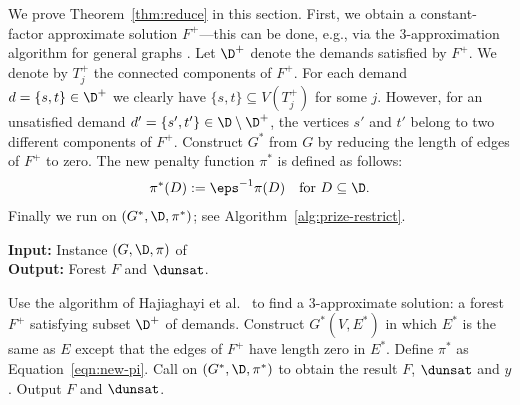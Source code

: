 We prove Theorem~\ref{thm:reduce} in this section.
First, we obtain a constant-factor approximate solution $F^+$---this can be done, e.g., via the $3$-approximation algorithm for general graphs \cite{HKKN10}.
Let $\D^+$ denote the demands satisfied by $F^+$.
 We denote by $T^+_j$ the connected components of $F^+$.
 For each demand $d=\{s,t\}\in\D^+$ we clearly have $\{s,t\} \subseteq V(T^+_j)$
for some $j$.  However, for an unsatisfied demand $d'=\{s',t'\} \in \D \setminus \D^+$,
the vertices $s'$ and $t'$ belong to  two different components of $F^+$.
Construct $G^\ast$ from $G$ by reducing the length of edges of $F^+$ to zero.
The new penalty function $\pi^\ast$ is defined as follows:
\begin{align}\label{eqn:new-pi}
\pi^\ast(D) &:= \eps^{-1} \pi(D) &\text{for } D \subseteq \D.
\end{align}
 Finally we run  on $(G^\ast, \D, \pi^\ast)$; see Algorithm~\ref{alg:prize-restrict}. 















\begin{algorithm}
\caption{\label{alg:prize-restrict}}
\textbf{Input:} Instance $(G, \D, \pi)$ of \\
\textbf{Output:} Forest $F$ and $\dunsat$.

\begin{algorithmic}[1]
 \STATE Use the algorithm of Hajiaghayi et al.~\cite{HKKN10} to find a $3$-approximate 
solution:  a forest $F^+$ satisfying subset $\D^+$ of demands.
\STATE Construct $G^\ast(V, E^\ast)$ in which $E^\ast$ is the same as $E$ except that
the edges of $F^+$ have length zero in $E^\ast$. \STATE Define $\pi^\ast$ as Equation~\eqref{eqn:new-pi}.
\STATE Call  on $(G^\ast, \D, \pi^\ast)$ to obtain the result $F$, $\dunsat$ and $y$.
\STATE Output $F$ and $\dunsat$.
\end{algorithmic}
\end{algorithm}


